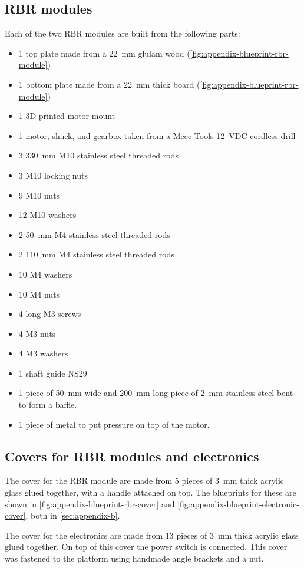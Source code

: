 \subsection{RBR modules}
Each of the two RBR modules are built from the following parts:
\begin{itemize}
  \item 1 top plate made from a 22~mm glulam wood (\cref{fig:appendix-blueprint-rbr-module})
  \item 1 bottom plate made from a 22~mm thick board (\cref{fig:appendix-blueprint-rbr-module})
  \item 1 3D printed motor mount
  \item 1 motor, shuck, and gearbox taken from a Meec Tools 12~VDC cordless drill 
  \item 3 330~mm M10 stainless steel threaded rods
  \item 3 M10 locking nuts
  \item 9 M10 nuts
  \item 12 M10 washers
  \item 2 50~mm M4 stainless steel threaded rods
  \item 2 110~mm M4 stainless steel threaded rods
  \item 10 M4 washers
  \item 10 M4 nuts
  \item 4 long M3 screws
  \item 4 M3 nuts
  \item 4 M3 washers
  \item 1 shaft guide NS29
  \item 1 piece of 50~mm wide and 200~mm long piece of 2~mm stainless steel
    bent to form a baffle.
  \item 1 piece of metal to put pressure on top of the motor.
\end{itemize}

\subsection{Covers for RBR modules and electronics}
The cover for the RBR module are made from 5 pieces of 3~mm thick acrylic glass
glued together, with a handle attached on top. The blueprints for these are shown in
\cref{fig:appendix-blueprint-rbr-cover} and \cref{fig:appendix-blueprint-electronic-cover},
both in \cref{sec:appendix-b}.

The cover for the electronics are made from 13 pieces of 3~mm thick acrylic glass
glued together. On top of this cover the power switch is connected. This cover
was fastened to the platform using handmade angle brackets and a nut.

